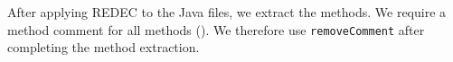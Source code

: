 \documentclass[%
class=scrreprt,
chapterprefix=false,%
open=right,%
twoside=false,%
paper=a4,%
logofile={Logo\_zentral\_farbig\_EN.png},%
thesistype=master,%
UKenglish,%
]{se2thesis}
\theoremstyle{definition}
\newcommand{\rdh}{REDEC\xspace}
\newcommand{\RDMs}{Readability Decreasing Modificatations\xspace}
\def\checkmark{\tikz\fill[scale=0.4](0,.35) -- (.25,0) -- (1,.7) -- (.25,.15) -- cycle;}
\begin{document}
	
	After applying \rdh to the Java files, we extract the methods. We require a method comment for all methods (). We therefore use \texttt{removeComment} after completing the method extraction.
	
\end{document}
